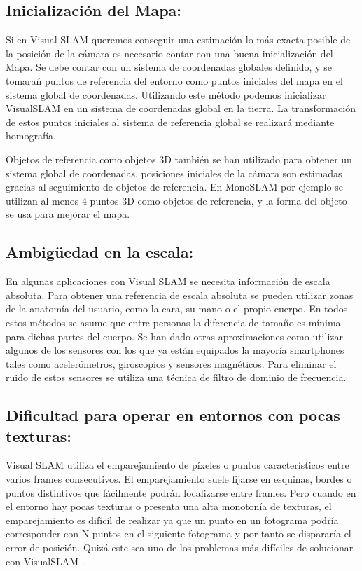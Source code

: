 \subsection{Inicialización del Mapa:}

Si en Visual SLAM queremos conseguir una estimación lo más exacta posible de la posición de la cámara es necesario contar con una buena inicialización del Mapa. Se debe contar con un sistema de coordenadas globales definido, y se tomarań puntos de referencia del entorno como puntos iniciales del mapa en el sistema global de coordenadas. Utilizando este método podemos inicializar VisualSLAM en un sistema de coordenadas global en la tierra. La transformación de estos puntos iniciales al sistema de referencia global se realizará mediante homografía.

Objetos de referencia como objetos 3D también se han utilizado para obtener un sistema global de coordenadas, posiciones iniciales de la cámara son estimadas gracias al seguimiento de objetos de referencia.
En MonoSLAM por ejemplo se utilizan al menos 4 puntos 3D como objetos de referencia, y la forma del objeto se usa para mejorar el mapa.

\subsection{Ambigüedad en la escala:}

En algunas aplicaciones con Visual SLAM se necesita información de escala absoluta. Para obtener una referencia de escala absoluta se pueden utilizar zonas de la anatomía del usuario, como la cara, su mano o el propio cuerpo. En todos estos métodos se asume que entre personas la diferencia de tamaño es mínima para dichas partes del cuerpo. Se han dado otras aproximaciones como utilizar algunos de los sensores con los que ya están equipados la mayoría smartphones tales como acelerómetros, giroscopios y sensores magnéticos. Para eliminar el ruido de estos sensores se utiliza una técnica de filtro de dominio de frecuencia.


\subsection{Dificultad para operar en entornos con pocas texturas:}

Visual SLAM utiliza el emparejamiento de píxeles o puntos característicos entre varios frames consecutivos. El emparejamiento suele fijarse en esquinas, bordes  o puntos distintivos que fácilmente podrán localizarse entre frames. Pero cuando en el entorno hay pocas texturas o presenta una alta monotonía de texturas,  el emparejamiento es difícil de realizar ya que un punto en un fotograma podría corresponder con N puntos en el siguiente fotograma y por tanto se dispararía el error de posición. Quizá este sea uno de los problemas más difíciles de solucionar con VisualSLAM
\cite{Takafumi17}.



\flushbottom





